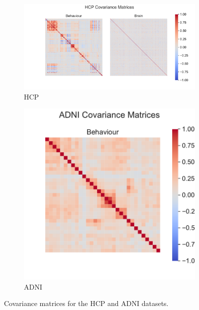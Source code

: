 \begin{figure}
\centering
\begin{subfigure}{0.49\linewidth}
\centering
\includegraphics[width=\linewidth]{figures/regularization/covariance/HCP_covariance}
\caption{HCP}
\end{subfigure}
%
\begin{subfigure}{0.49\linewidth}
\centering
\includegraphics[width=\linewidth]{figures/regularization/covariance/ADNI_covariance}
\caption{ADNI}
\end{subfigure}
\caption{Covariance matrices for the HCP and ADNI datasets.}
\label{fig:covariance-matrices}
\end{figure}

